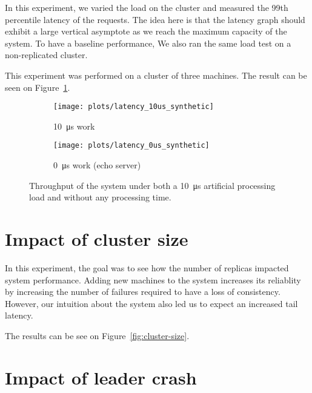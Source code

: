 In this experiment, we varied the load on the cluster and measured the 99th percentile latency of the requests.
The idea here is that the latency graph should exhibit a large vertical asymptote as we reach the maximum capacity of the system. 
To have a baseline performance, We also ran the same load test on a non-replicated cluster.

This experiment was performed on a cluster of three machines.
The result can be seen on Figure~\ref{fig:latency-throughput}.


\begin{figure}[p]
    \centering
    \begin{subfigure}[t]{0.8\textwidth}
        \texttt{[image: plots/latency\_10us\_synthetic]}
        \caption{\SI{10}{\micro\second} work}
    \end{subfigure}

    \begin{subfigure}[t]{0.8\textwidth}
        \texttt{[image: plots/latency\_0us\_synthetic]}
        \caption{\SI{0}{\micro\second} work (echo server)}
    \end{subfigure}
    \caption{
        Throughput of the system under both a \SI{10}{\micro\second} artificial processing load and without any processing time.
        \label{fig:latency-throughput}
    }
\end{figure}


\section{Impact of cluster size}

In this experiment, the goal was to see how the number of replicas impacted system performance.
Adding new machines to the system increases its reliablity by increasing the number of failures required to have a loss of consistency.
However, our intuition about the system also led us to expect an increased tail latency.

The results can be see on Figure~\ref{fig:cluster-size}.

\section{Impact of leader crash}

